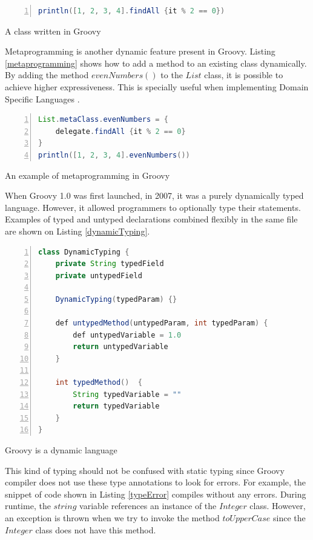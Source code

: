 \documentclass[preprint]{sigplanconf}
\begin{document}
\begin{Listing}[ht]
\begin{lstlisting}[language=Java,tabsize=2,breaklines=true,numbers=left]
println([1, 2, 3, 4].findAll {it % 2 == 0})
\end{lstlisting}
\caption{A class written in Groovy}
\label{dynamicInfuence}
\end{Listing}

Metaprogramming is another dynamic feature present in Groovy. 
Listing \ref{metaprogramming} shows how to add a method to an existing class dynamically.
By adding the method $evenNumbers()$ to the $List$ class, it is possible to achieve higher expressiveness.
This is specially useful when implementing Domain Specific Languages \cite{fowler10}.

\begin{Listing}[ht]
\begin{lstlisting}[language=Java,tabsize=2,breaklines=true,numbers=left]
List.metaClass.evenNumbers = {
	delegate.findAll {it % 2 == 0}
}
println([1, 2, 3, 4].evenNumbers())

\end{lstlisting}
\caption{An example of metaprogramming in Groovy}
\label{metaprogramming}
\end{Listing}

When Groovy 1.0 was first launched, in 2007, it was a purely dynamically typed language.
However, it allowed programmers to optionally type their statements.
Examples of typed and untyped declarations combined flexibly in the same file are shown on Listing \ref{dynamicTyping}.


\begin{Listing}[ht]
\begin{lstlisting}[language=Java,tabsize=2,breaklines=true,numbers=left]
class DynamicTyping {
	private String typedField
	private untypedField

	DynamicTyping(typedParam) {}

	def untypedMethod(untypedParam, int typedParam) {
		def untypedVariable = 1.0
		return untypedVariable
	}

	int typedMethod()  {
		String typedVariable = ""
		return typedVariable
	}
}
\end{lstlisting}
\caption{Groovy is a dynamic language}
\label{dynamicTyping}
\end{Listing}

This kind of typing should not be confused with static typing since Groovy compiler does not use these type annotations to look for errors.
For example, the snippet of code shown in Listing \ref{typeError} compiles without any errors.
During runtime, the $string$ variable references an instance of the $Integer$ class.
However, an exception is thrown when we try to invoke the method $toUpperCase$ since the $Integer$ class does not have this method.
\end{document}
